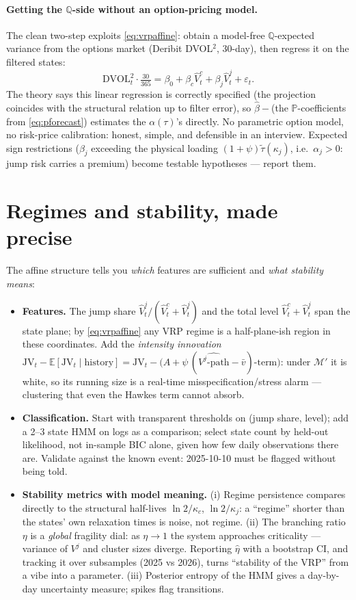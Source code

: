 \documentclass[11pt]{report}
\theoremstyle{definition}
\theoremstyle{remark}
\newcommand{\E}{\mathbb{E}}
\newcommand{\Vc}{V^{c}}
\newcommand{\Vj}{V^{j}}
\newcommand{\JV}{\mathrm{JV}}
\begin{document}
\paragraph{Getting the $\mathbb{Q}$-side without an option-pricing model.}
The clean two-step exploits \eqref{eq:vrpaffine}: obtain a model-free
$\mathbb{Q}$-expected variance from the options market (Deribit DVOL$^{2}$,
30-day), then regress it on the filtered states:
\[
\mathrm{DVOL}^{2}_{t}\cdot\tfrac{30}{365}
=\beta_{0}+\beta_{c}\hat\Vc_{t}+\beta_{j}\hat\Vj_{t}+\varepsilon_{t}.
\]
The theory says this linear regression is correctly specified (the
projection coincides with the structural relation up to filter error), so
$\hat\beta-$(the $\mathbb{P}$-coefficients from \eqref{eq:pforecast})
estimates the $\alpha(\tau)$'s directly. No parametric option model, no
risk-price calibration: honest, simple, and defensible in an interview.
Expected sign restrictions ($\beta_{j}$ exceeding the physical loading
$(1+\psi)\tilde\tau(\kappa_j)$, i.e.\ $\alpha_j>0$: jump risk carries a
premium) become testable hypotheses --- report them.

\section{Regimes and stability, made precise}

The affine structure tells you \emph{which} features are sufficient and
\emph{what stability means}:
\begin{itemize}
\item \textbf{Features.} The jump share $\hat\Vj_{t}/(\hat\Vc_{t}+\hat\Vj_{t})$
and the total level $\hat\Vc_{t}+\hat\Vj_{t}$ span the state plane; by
\eqref{eq:vrpaffine} any VRP regime is a half-plane-ish region in these
coordinates. Add the \emph{intensity innovation}
$\JV_{t}-\E[\JV_{t}\mid\text{history}]
=\JV_{t}-\big(A+\psi\,(\widehat{\Vj\text{-path}}-\bar v)\text{-term}\big)$:
under $\mathcal{M}'$ it is white, so its running size is a real-time
misspecification/stress alarm --- clustering that even the Hawkes term
cannot absorb.
\item \textbf{Classification.} Start with transparent thresholds on
(jump share, level); add a 2--3 state HMM on logs as a comparison; select
state count by held-out likelihood, not in-sample BIC alone, given how few
daily observations there are. Validate against the known event: 2025-10-10 must be flagged
without being told.
\item \textbf{Stability metrics with model meaning.} (i) Regime persistence
compares directly to the structural half-lives $\ln2/\kappa_{c}$,
$\ln2/\kappa_{j}$: a ``regime'' shorter than the states' own relaxation
times is noise, not regime. (ii) The branching ratio $\eta$ is a
\emph{global} fragility dial: as $\eta\to1$ the system approaches
criticality --- variance of $\Vj$ and cluster sizes diverge. Reporting
$\hat\eta$ with a bootstrap CI, and tracking it over subsamples
(2025 vs 2026), turns ``stability of the VRP'' from a vibe into a
parameter. (iii) Posterior entropy of the HMM gives a day-by-day
uncertainty measure; spikes flag transitions.
\end{itemize}
\end{document}
